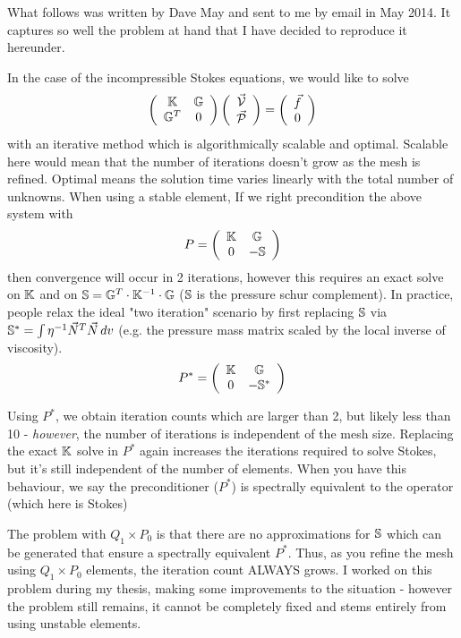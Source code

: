 What follows was written by Dave May and sent to me by email in May 2014. 
It captures so well the problem at hand that I have decided to reproduce it hereunder.

\hspace{4mm}

In the case of the incompressible Stokes equations, we would like to solve
\[
\left(
\begin{array}{cc}
{\mathbb{K}}   & {\mathbb{G}}\\
{\mathbb{G}}^T & 0
\end{array}
\right)
\left(
\begin{array}{c}
\vec{\cal V}\\
\vec{\cal P}
\end{array}
\right)
= 
\left(
\begin{array}{c}
\vec f \\0
\end{array}
\right)
\]
with an iterative method which is algorithmically scalable and optimal. 
Scalable here would mean
that the number of iterations doesn't grow as the mesh is refined. Optimal means the solution 
time varies linearly with the total number of unknowns. 
When using a stable element,
If we right precondition the above system with
\[
P=
\left(
\begin{array}{cc}
{\mathbb{K}}   & {\mathbb{G}}\\
0   & -{\mathbb{S}}
\end{array}
\right)
\]
then convergence will occur in 2 iterations,
however this requires an exact solve on ${\mathbb{K}}$ 
and on ${\mathbb{S}} = {\mathbb{G}}^T\cdot {\mathbb{K}}^{-1}\cdot {\mathbb{G}}$ (${\mathbb{S}}$ is the pressure schur complement).
In practice, people relax the ideal "two iteration" scenario by first replacing
${\mathbb{S}}$ via 
${\mathbb{S}}^* = \int \eta^{-1} \vec N^T \vec N \, dv$ 
(e.g. the pressure mass matrix scaled by the local inverse of viscosity).
\[
P^*=
\left(
\begin{array}{cc}
{\mathbb{K}}   & {\mathbb{G}}\\
0   & -{\mathbb{S}}^*
\end{array}
\right)
\]

Using $P^*$, we obtain iteration counts which are larger than 2, but likely
less than 10 - {\it however}, the number of iterations is independent of the mesh size.
Replacing the exact ${\mathbb{K}}$ solve in $P^*$ again increases the iterations required to solve Stokes,
but it's still independent of the number of elements. When you have this behaviour,
we say the preconditioner ($P^*$) is spectrally equivalent to the operator (which here is Stokes)

The problem with $Q_1\times P_0$ is that there are no approximations for
${\mathbb{S}}$ which can be generated that ensure a spectrally equivalent $P^*$. Thus, as you refine
the mesh using $Q_1 \times P_0$ elements, the iteration count ALWAYS grows. I worked on this problem
during my thesis, making some improvements to the situation - however the problem still remains,
it cannot be completely fixed and stems entirely from using unstable elements.

